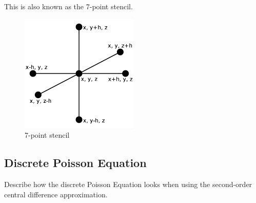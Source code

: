 This is also known as the 7-point stencil.

\begin{figure}[h]
	\center
	\includegraphics[width=0.5\textwidth]{images/7_point_stencil}
	\caption{7-point stencil}
\end{figure}


\subsection*{Discrete Poisson Equation}

Describe how the discrete Poisson Equation looks when using the second-order central 
difference approximation.
